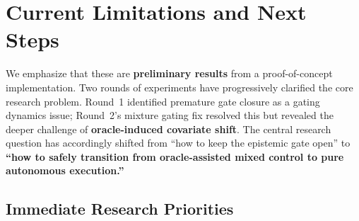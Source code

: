 \documentclass[11pt, a4paper]{article}
\begin{document}
\section{Current Limitations and Next Steps}
\label{sec:limitations}

We emphasize that these are \textbf{preliminary results} from a proof-of-concept implementation. Two rounds of experiments have progressively clarified the core research problem. Round~1 identified premature gate closure as a gating dynamics issue; Round~2's mixture gating fix resolved this but revealed the deeper challenge of \textbf{oracle-induced covariate shift}. The central research question has accordingly shifted from ``how to keep the epistemic gate open'' to \textbf{``how to safely transition from oracle-assisted mixed control to pure autonomous execution.''}

\subsection{Immediate Research Priorities}
\end{document}
